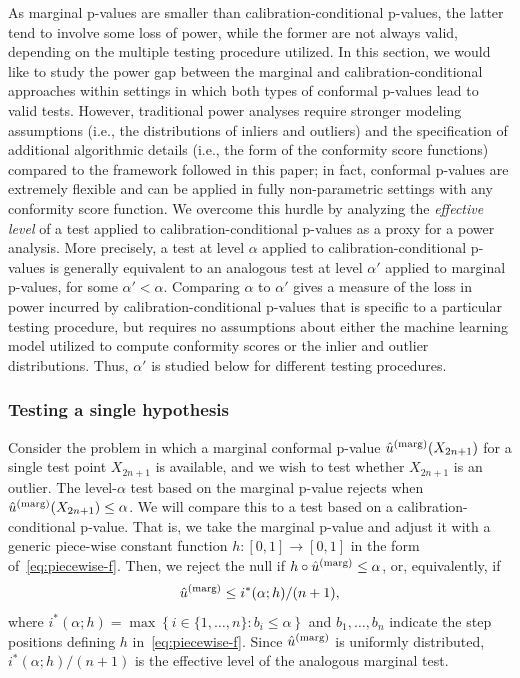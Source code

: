 \documentclass[11pt]{article}
\def\marg{\textnormal{(marg)}}
\renewcommand{\P}{\mathbb{P}}
\begin{document}
As marginal p-values are smaller than calibration-conditional p-values, the latter tend to involve some loss of power, while the former are not always valid, depending on the multiple testing procedure utilized.
In this section, we would like to study the power gap between the marginal and calibration-conditional approaches within settings in which both types of conformal p-values lead to valid tests.
However, traditional power analyses require stronger modeling assumptions (i.e., the distributions of inliers and outliers) and the specification of additional algorithmic details (i.e., the form of the conformity score functions) compared to the framework followed in this paper; in fact, conformal p-values are extremely flexible and can be applied in fully non-parametric settings with any conformity score function.
We overcome this hurdle by analyzing the {\em effective level} of a test applied to calibration-conditional p-values as a proxy for a power analysis. 
More precisely, a test at level $\alpha$ applied to calibration-conditional p-values is generally equivalent to an analogous test at level $\alpha'$ applied to marginal p-values, for some $\alpha' < \alpha$.
Comparing $\alpha$ to $\alpha'$ gives a measure of the loss in power incurred by calibration-conditional p-values that is specific to a particular testing procedure, but requires no assumptions about either the machine learning model utilized to compute conformity scores or the inlier and outlier distributions. 
Thus, $\alpha'$ is studied below for different testing procedures.

\subsubsection{Testing a single hypothesis} \label{sec:power-single}

Consider the problem in which a marginal conformal p-value $\hat{u}^\marg(X_{2n+1})$ for a single test point $X_{2n+1}$ is available, and we wish to test whether $X_{2n+1}$ is an outlier. The level-$\alpha$ test based on the marginal p-value rejects when $\hat{u}^\marg(X_{2n+1}) \le \alpha$. We will compare this to a test based on a calibration-conditional p-value. That is, we take the marginal p-value and adjust it with a generic piece-wise constant function $h : [0,1] \to [0,1]$ in the form of~\eqref{eq:piecewise-f}. Then, we reject the null if $h \circ \hat{u}^\marg \leq \alpha$, or, equivalently, if
\begin{equation*}
  \hat{u}^\marg \leq {i^*(\alpha; h)}/{(n+1)},
\end{equation*}
where $i^*(\alpha; h) = \max \left\{ i \in \{1,\ldots,n\} : b_i \leq \alpha \right\}$ and $b_1, \ldots, b_n$ indicate the step positions defining $h$ in~\eqref{eq:piecewise-f}.
Since $\hat{u}^\marg$ is uniformly distributed, $i^{*}(\alpha; h) / (n + 1)$ is the effective level of the analogous marginal test. 
\end{document}
